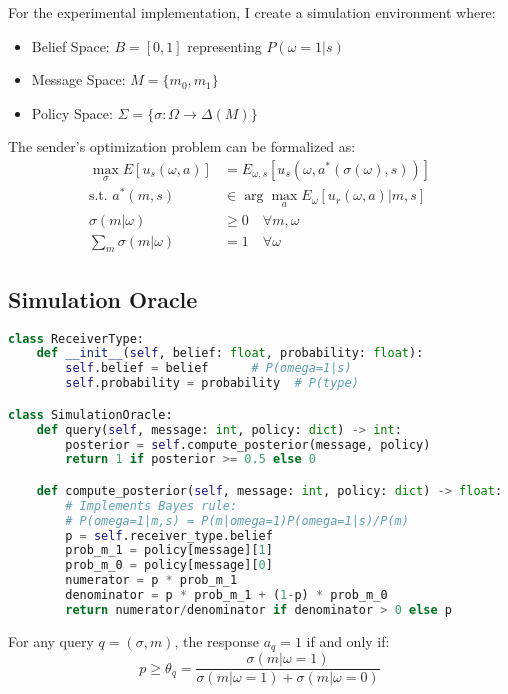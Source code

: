 \documentclass[12pt]{article}
\theoremstyle{plain}
\theoremstyle{definition}
\theoremstyle{remark}
\begin{document}
For the experimental implementation, I create a simulation environment where:
\begin{itemize}
    \item Belief Space: $B = [0,1]$ representing $P(\omega=1|s)$
    \item Message Space: $M = \{m_0, m_1\}$
    \item Policy Space: $\Sigma = \{\sigma: \Omega \rightarrow \Delta(M)\}$
\end{itemize}

The sender's optimization problem can be formalized as:
\begin{align*}
    \max_\sigma E[u_s(\omega,a)] &= E_{\omega,s}[u_s(\omega,a^*(\sigma(\omega),s))] \\
    \text{s.t. } a^*(m,s) &\in \arg\max_a E_\omega[u_r(\omega,a)|m,s] \\
    \sigma(m|\omega) &\geq 0 \quad \forall m,\omega \\
    \sum_m \sigma(m|\omega) &= 1 \quad \forall\omega
\end{align*}

\subsection{Simulation Oracle}

\begin{lstlisting}[language=Python, caption=Core Implementation Classes]
class ReceiverType:
    def __init__(self, belief: float, probability: float):
        self.belief = belief      # P(omega=1|s)
        self.probability = probability  # P(type)

class SimulationOracle:
    def query(self, message: int, policy: dict) -> int:
        posterior = self.compute_posterior(message, policy)
        return 1 if posterior >= 0.5 else 0

    def compute_posterior(self, message: int, policy: dict) -> float:
        # Implements Bayes rule:
        # P(omega=1|m,s) = P(m|omega=1)P(omega=1|s)/P(m)
        p = self.receiver_type.belief
        prob_m_1 = policy[message][1]
        prob_m_0 = policy[message][0]
        numerator = p * prob_m_1
        denominator = p * prob_m_1 + (1-p) * prob_m_0
        return numerator/denominator if denominator > 0 else p
\end{lstlisting}

For any query $q = (\sigma, m)$, the response $a_q = 1$ if and only if:
\begin{equation}
    p \geq \theta_q = \frac{\sigma(m|\omega=1)}{\sigma(m|\omega=1) + \sigma(m|\omega=0)}
\end{equation}
\end{document}
